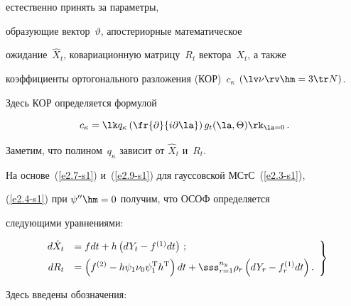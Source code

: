 естественно принять за параметры,

 образующие вектор~$\vartheta$, апостериорные математическое

 ожидание~$\hat X_t$, ковариационную матрицу~$R_t$ вектора~$X_t$, а также

 коэффициенты ортогонального разложения (КОР)~$c_\kappa$ $(\lv \nu\rv\hm = 3\tr N)$.

 Здесь КОР определяется формулой

\begin{equation}

c_\kappa = \lk q_\kappa \left(\fr{\partial }{i\partial \la}\right) 

g_t (\la,\Theta)\rk_{\la=0}\,.\label{e4.2-s1}

\end{equation}

Заметим, что полином~$q_\kappa$ зависит от $\hat X_t$ и~$R_t$.



На основе~(\ref{e2.7-s1}) и~(\ref{e2.9-s1}) для  гауссовской МСтС~(\ref{e2.3-s1}), 

(\ref{e2.4-s1}) при  $\psi''\hm=0$ получим, что ОСОФ определяется 

следующими уравнениями:

\begin{equation}

\left.

\begin{array}{rl}

d\hat X_t&=fdt + h \left(dY_t- f^{(1)} dt\right)\,;\\[6pt]

dR_t&=\displaystyle \left(f^{(2)} -h\psi_1\nu_0\psi_1^{\mathrm{T}} h^{\mathrm{T}}\right) dt +\sss_{r=1}^{n_y}

    \rho_r \left(dY_r -f_r^{(1)} dt\right). %

    \end{array}

    \right\}

    \label{e4.3-s1}

    \end{equation}

Здесь введены обозначения:

